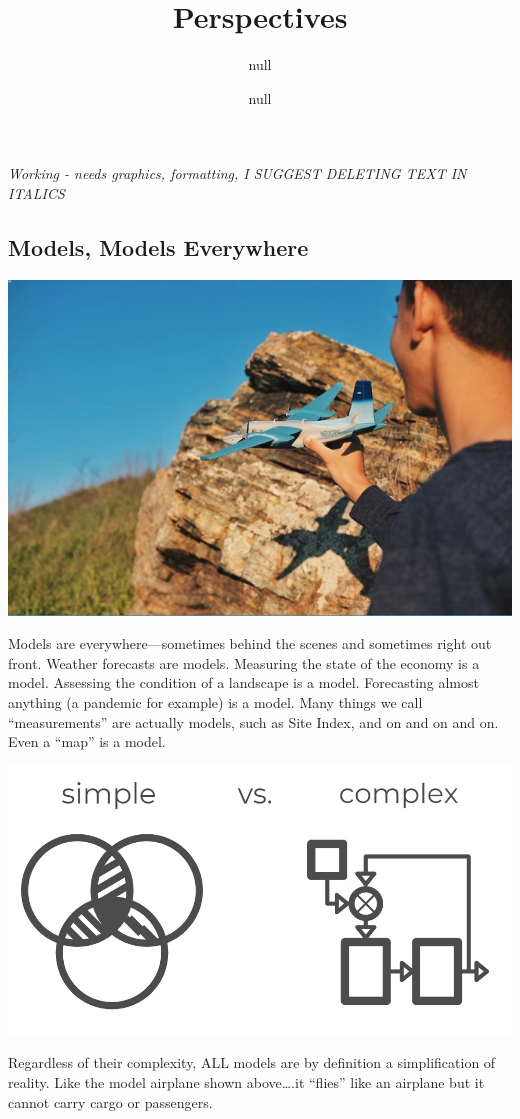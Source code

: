 \documentclass[
]{article}
\title{Perspectives}
\author{null}
\date{null}
\begin{document}
\maketitle

{
\setcounter{tocdepth}{2}
\tableofcontents
}
\emph{Working - needs graphics, formatting, I SUGGEST DELETING TEXT IN
ITALICS}

\hypertarget{models-models-everywhere}{%
\subsection{Models, Models Everywhere}\label{models-models-everywhere}}

\includegraphics{images/models.png}

Models are everywhere---sometimes behind the scenes and sometimes right
out front. Weather forecasts are models. Measuring the state of the
economy is a model. Assessing the condition of a landscape is a model.
Forecasting almost anything (a pandemic for example) is a model. Many
things we call ``measurements'' are actually models, such as Site Index,
and on and on and on. Even a ``map'' is a model.

\includegraphics[width=0.45\linewidth]{images/model-simple-vs-complex1}

Regardless of their complexity, ALL models are by definition a
simplification of reality. Like the model airplane shown above\ldots.it
``flies'' like an airplane but it cannot carry cargo or passengers.
\end{document}
